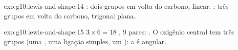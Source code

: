 \begin{solution}{exo:g10:lewis-and-shape:14}
: dois grupos em volta do carbono, linear.
: três grupos em volta do carbono,
trigonal plana.
\end{solution}

\begin{solution}{exo:g10:lewis-and-shape:15}
$3 \times 6 = 18$ , 9 pares:
. O oxigênio
central tem três grupos (uma , uma ligação simples, um ): a  é angular.
\end{solution}

